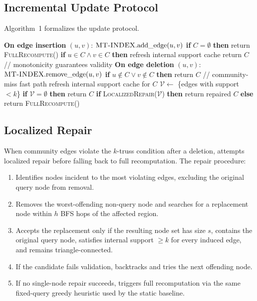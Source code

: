 \subsection{Incremental Update Protocol}

Algorithm~1 formalizes the update protocol.

\begin{algorithm}[t]
\caption{Incremental Update Protocol for \DynaSCSH}
\label{alg:update}
\begin{algorithmic}[1]
\STATE \textbf{On edge insertion} $(u,v)$:
\STATE \quad $\textsc{MT-INDEX}.\text{add\_edge}(u,v)$
\STATE \quad \textbf{if} $C = \emptyset$ \textbf{then} return \textsc{FullRecompute}()
\STATE \quad \textbf{if} $u \in C \land v \in C$ \textbf{then} refresh internal support cache
\STATE \quad return $C$ \quad // monotonicity guarantees validity
\STATE \textbf{On edge deletion} $(u,v)$:
\STATE \quad $\textsc{MT-INDEX}.\text{remove\_edge}(u,v)$
\STATE \quad \textbf{if} $u \notin C \lor v \notin C$ \textbf{then} return $C$ \quad // community-miss fast path
\STATE \quad refresh internal support cache for $C$
\STATE \quad $\mathcal{V} \leftarrow$ \{edges with support $< k$\}
\STATE \quad \textbf{if} $\mathcal{V} = \emptyset$ \textbf{then} return $C$
\STATE \quad \textbf{if} \textsc{LocalizedRepair}($\mathcal{V}$)
\STATE \quad\quad \textbf{then} return repaired $C$
\STATE \quad \textbf{else} return \textsc{FullRecompute}()
\end{algorithmic}
\end{algorithm}

\subsection{Localized Repair}

When community edges violate the $k$-truss condition after a deletion, \DynaSCSH attempts localized repair before falling back to full recomputation. The repair procedure:

\begin{enumerate}
\item Identifies nodes incident to the most violating edges, excluding the original query node from removal.
\item Removes the worst-offending non-query node and searches for a replacement node within $h$ BFS hops of the affected region.
\item Accepts the replacement only if the resulting node set has size $s$, contains the original query node, satisfies internal support $\geq k$ for every induced edge, and remains triangle-connected.
\item If the candidate fails validation, backtracks and tries the next offending node.
\item If no single-node repair succeeds, triggers full recomputation via the same fixed-query greedy heuristic used by the static baseline.
\end{enumerate}

